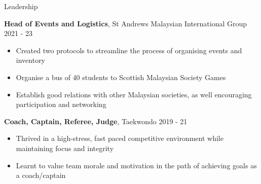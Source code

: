 \documentclass{resume} %
\begin{document}
\begin{rSection}{Leadership} 


\textbf{Head of Events and Logistics}, St Andrews Malaysian International Group \hfill 2021 - 23 
\vspace*{-5pt}
\begin{itemize}
    \itemsep -5pt {} 
    \item Created two protocols to streamline the process of organising events and inventory
    \item Organise a bus of 40 students to Scottish Malaysian Society Games
    \item Establish good relations with other Malaysian societies, as well encouraging participation and networking
\end{itemize}


\textbf{Coach, Captain, Referee, Judge}, Taekwondo \hfill 2019 - 21
\vspace*{-5pt}
\begin{itemize}
    \itemsep -5pt {} 
    \item Thrived in a high-stress, fast paced competitive environment while maintaining focus and integrity
    \item Learnt to value team morale and motivation in the path of achieving goals as a coach/captain
\end{itemize}

\end{rSection}
\end{document}
